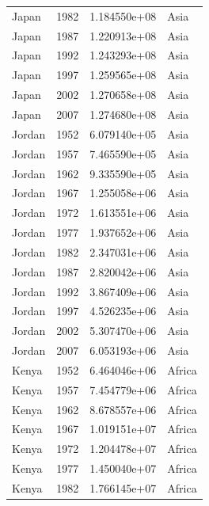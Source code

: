 \documentclass[
  letterpaper,
  DIV=11,
  numbers=noendperiod]{scrreprt}
\begin{document}
\begin{tcolorbox}
\begin{tabular}{lrrl}
Japan                    &  1982 &  1.184550e+08 &      Asia \\
Japan                    &  1987 &  1.220913e+08 &      Asia \\
Japan                    &  1992 &  1.243293e+08 &      Asia \\
Japan                    &  1997 &  1.259565e+08 &      Asia \\
Japan                    &  2002 &  1.270658e+08 &      Asia \\
Japan                    &  2007 &  1.274680e+08 &      Asia \\
Jordan                   &  1952 &  6.079140e+05 &      Asia \\
Jordan                   &  1957 &  7.465590e+05 &      Asia \\
Jordan                   &  1962 &  9.335590e+05 &      Asia \\
Jordan                   &  1967 &  1.255058e+06 &      Asia \\
Jordan                   &  1972 &  1.613551e+06 &      Asia \\
Jordan                   &  1977 &  1.937652e+06 &      Asia \\
Jordan                   &  1982 &  2.347031e+06 &      Asia \\
Jordan                   &  1987 &  2.820042e+06 &      Asia \\
Jordan                   &  1992 &  3.867409e+06 &      Asia \\
Jordan                   &  1997 &  4.526235e+06 &      Asia \\
Jordan                   &  2002 &  5.307470e+06 &      Asia \\
Jordan                   &  2007 &  6.053193e+06 &      Asia \\
Kenya                    &  1952 &  6.464046e+06 &    Africa \\
Kenya                    &  1957 &  7.454779e+06 &    Africa \\
Kenya                    &  1962 &  8.678557e+06 &    Africa \\
Kenya                    &  1967 &  1.019151e+07 &    Africa \\
Kenya                    &  1972 &  1.204478e+07 &    Africa \\
Kenya                    &  1977 &  1.450040e+07 &    Africa \\
Kenya                    &  1982 &  1.766145e+07 &    Africa \\

\end{tabular}
\end{tcolorbox}
\end{document}
